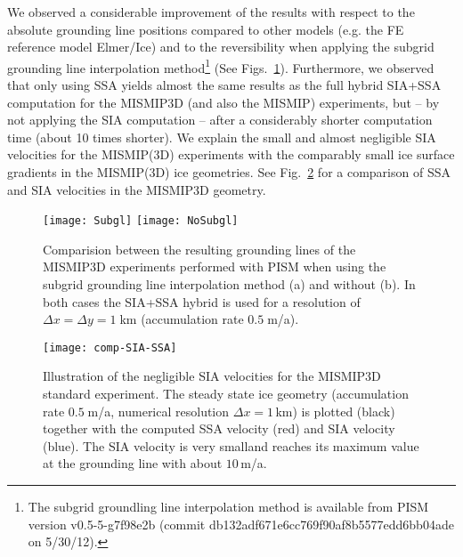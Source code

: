 We observed a considerable improvement of the results with respect to the absolute grounding line positions compared to other models (e.g. the FE reference model Elmer/Ice) and to the reversibility when applying the subgrid grounding line interpolation method\footnote{The subgrid groundling line interpolation method is available from PISM version v0.5-5-g7f98e2b (commit db132adf671e6cc769f90af8b5577edd6bb04ade on 5/30/12).} (See Figs.~\ref{fig:Subgl}). Furthermore, we observed that only using SSA yields almost the same results as the full hybrid SIA+SSA computation for the MISMIP3D (and also the MISMIP) experiments, but -- by not applying the SIA computation -- after a considerably shorter computation time (about 10 times shorter). We explain the small and almost negligible SIA velocities for the MISMIP(3D) experiments with the comparably small ice surface gradients in the MISMIP(3D) ice geometries. See Fig.~\ref{fig:compSIASSA} for a comparison of SSA and SIA velocities in the MISMIP3D geometry.

\begin{figure}[ht]
\centering
\texttt{[image: Subgl]}
\texttt{[image: NoSubgl]}
\caption{Comparision between the resulting grounding lines of the MISMIP3D experiments performed with PISM when using the subgrid grounding line interpolation method (a) and without (b). In both cases the SIA+SSA hybrid is used for a resolution of $\Delta x = \Delta y = 1\;$km (accumulation rate $0.5\;$m/a).}
\label{fig:Subgl}
\end{figure}

\begin{figure}[ht]
\centering
\texttt{[image: comp-SIA-SSA]}
\caption{Illustration of the negligible SIA velocities for the MISMIP3D standard experiment. The steady state ice geometry (accumulation rate $0.5\;$m/a, numerical resolution $\Delta x = 1\,$km) is plotted (black) together with the computed SSA velocity (red) and SIA velocity (blue). The SIA velocity is very smalland reaches its maximum value at the grounding line with about $10\,$m/a.}
\label{fig:compSIASSA}
\end{figure}

